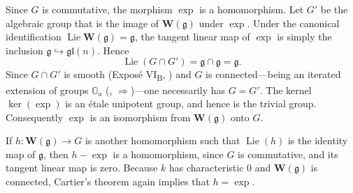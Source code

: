 Since \(G\) is commutative, the morphism \(\exp\) is a
homomorphism.  Let \(G'\) be the algebraic group that is the image
of \(\mathbf W(\mathfrak g)\) under \(\exp\).  Under the canonical
identification
\(\operatorname{Lie}\mathbf W(\mathfrak g)=\mathfrak g\), the
tangent linear map of \(\exp\) is simply the inclusion
\(\mathfrak g\hookrightarrow\mathfrak{gl}(n)\).  Hence
\[
  \operatorname{Lie}(G\cap G')
  =\mathfrak g\cap\mathfrak g=\mathfrak g.
\]
Since \(G\cap G'\) is smooth (Exposé VI\textsubscript{B}, )
and \(G\) is connected---being an iterated extension of groups
\(\mathbb G_a\) (, \(\Rightarrow\))---one necessarily has
\(G=G'\).  The kernel \(\ker(\exp)\) is an étale unipotent group,
and hence is the trivial group.  Consequently \(\exp\) is an
isomorphism from \(\mathbf W(\mathfrak g)\) onto \(G\).

If \(h:\mathbf W(\mathfrak g)\to G\) is another homomorphism such
that \(\operatorname{Lie}(h)\) is the identity map of
\(\mathfrak g\), then \(h-\exp\) is a homomorphism, since \(G\) is
commutative, and its tangent linear map is zero.  Because \(k\) has
characteristic \(0\) and \(\mathbf W(\mathfrak g)\) is connected,
Cartier's theorem again implies that \(h=\exp\).



